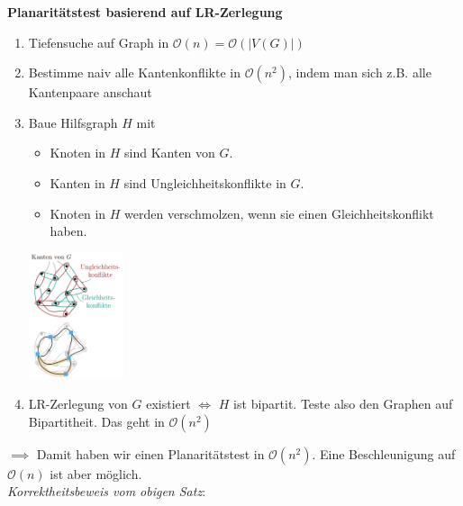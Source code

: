 \textbf{Planaritätstest basierend auf LR-Zerlegung}
\begin{enumerate}
	\item Tiefensuche auf Graph in $\mathcal{O}(n)=\mathcal{O}(|V(G)|)$
	\item Bestimme naiv alle Kantenkonflikte in $\mathcal{O}(n^2)$, indem man sich z.B. alle Kantenpaare anschaut
	\item Baue Hilfsgraph $H$ mit
	\begin{itemize}
		\item Knoten in $H$ sind Kanten von $G$.
		\item Kanten in $H$ sind Ungleichheitskonflikte in $G$.
		\item Knoten in $H$ werden verschmolzen, wenn sie einen Gleichheitskonflikt haben.
	\end{itemize}
	\begin{center}
		\includegraphics[width=0.22\textwidth]{images/planar-test.png}
	\end{center}
	\item LR-Zerlegung von $G$ existiert $\iff$ $H$ ist bipartit. Teste also den Graphen auf Bipartitheit. Das geht in $\mathcal{O}(n^2)$
\end{enumerate}
$\implies$ Damit haben wir einen Planaritätstest in $\mathcal{O}(n^2)$. Eine Beschleunigung auf $\mathcal{O}(n)$ ist aber möglich.\\

\textit{Korrektheitsbeweis vom obigen Satz}:

